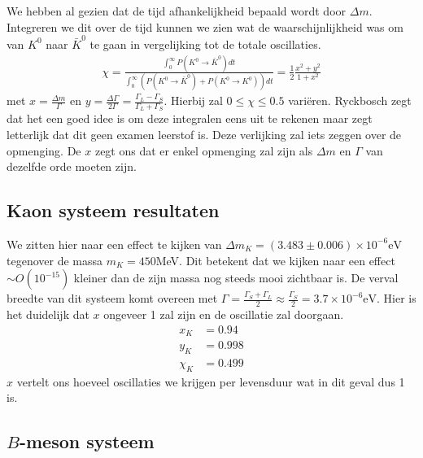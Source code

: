 \documentclass[../main.tex]{subfiles}
\begin{document}
We hebben al gezien dat de tijd afhankelijkheid bepaald wordt door $\Delta m$. Integreren we dit over de tijd kunnen we zien wat de waarschijnlijkheid was om van $K^0$ naar $\bar{K}^0$ te gaan in vergelijking tot de totale oscillaties.
\begin{equation}
    \begin{aligned}
        \label{eq:kaon_osc_tijd_int}
        \chi=\frac{\int_{0}^{\infty} P\left(K^{0} \rightarrow \bar{K}^{0}\right) d t}{\int_{0}^{\infty}\left(P\left(K^{0} \rightarrow \bar{K}^{0}\right)+P\left(K^{0} \rightarrow K^{0}\right)\right) d t}=\frac{1}{2} \frac{x^{2}+y^{2}}{1+x^{2}}
    \end{aligned}
\end{equation}
met $x= \frac{\Delta m}{\Gamma}$ en $y= \frac{\Delta \Gamma}{2\Gamma} = \frac{\Gamma_L-\Gamma_S}{\Gamma_L + \Gamma_S}$. Hierbij zal $0\leq \chi \leq 0.5$ variëren. {\color{blue} Ryckbosch zegt dat het een goed idee is om deze integralen eens uit te rekenen maar zegt letterlijk dat dit geen examen leerstof is.} Deze verlijking zal iets zeggen over de opmenging. De $x$ zegt ons dat er enkel opmenging zal zijn als $\Delta m$ en $\Gamma$ van dezelfde orde moeten zijn.

\subsection{Kaon systeem resultaten}%
\label{sub:kaon_systeem_resultaten}

We zitten hier naar een effect te kijken van $\Delta m_K = (3.483 \pm 0.006) \times 10^{-6} \text{eV}$ tegenover de massa $m_K = 450$MeV. Dit betekent dat we kijken naar een effect $\sim O(10^{-15})$ kleiner dan de zijn massa nog steeds mooi zichtbaar is. De verval breedte van dit systeem komt overeen met $\Gamma=\frac{\Gamma_{S}+\Gamma_{L}}{2} \approx \frac{\Gamma_{S}}{2}=3.7 \times 10^{-6} \text{eV}$. Hier is het duidelijk dat $x$ ongeveer 1 zal zijn en de oscillatie zal doorgaan.
\begin{equation}
    \begin{aligned}
        \label{eq:kaon_osc_exp_results}
        x_{K} &=0.94 \\
        y_{K} &=0.998 \\
        \chi_{K} &=0.499
    \end{aligned}
\end{equation}
$x$ vertelt ons hoeveel oscillaties we krijgen per levensduur wat in dit geval dus 1 is.

\subsection{$B$-meson systeem}%
\label{sub:_b_meson_systeem}
\end{document}

